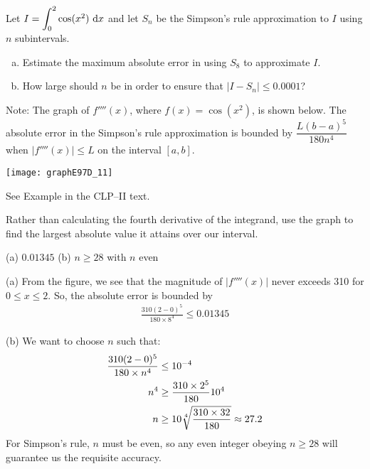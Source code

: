 \begin{question}[1997D]
Let $I={\displaystyle\int_0^2}\cos(x^2)\ \dee{x}$ and
let $S_n$ be the Simpson's rule approximation to $I$ using $n$ subintervals.
\begin{enumerate}[(a)]
\item
Estimate the maximum absolute error in using $S_8$ to approximate $I$.
\item
How large should $n$ be in order to ensure that $|I-S_n|\le 0.0001$?
\end{enumerate}
\noindent  Note: The graph of $f''''(x)$, where $f(x)=\cos(x^2)$,
is shown below. The absolute error in the Simpson's rule approximation
is bounded by $\dfrac{L(b-a)^5}{180n^4}$ when $|f''''(x)|\le L$ on the
interval $[a,b]$.

\begin{center}
       \texttt{[image: graphE97D\_11]}
\end{center}

\end{question}

\begin{hint}
See Example  in the
CLP--II text.

Rather than calculating the fourth derivative of the integrand, use the graph to find the largest absolute value it attains over our interval.
\end{hint}

\begin{answer} (a)
$0.01345$
\qquad (b)
 $n\ge 28$ with $n$ even

\end{answer}

\begin{solution} (a)
From the figure, we see that the magnitude of $|f''''(x)|$
never exceeds 310 for $0\le x\le 2$. So, the absolute error is bounded by
\begin{align*}
\frac{310(2-0)^5}{180\times 8^4}\le 0.01345
\end{align*}

\noindent (b)
We want to choose $n$ such that:
\begin{align*}
\frac{310(2-0)^5}{180\times n^4}&\le 10^{-4}\\
n^4&\ge \frac{310\times 2^5}{180}10^4\\
n&\ge 10\root 4 \of {\frac{310\times 32}{180}}\approx27.2
\end{align*}
For Simpson's rule, $n$ must be even, so any even integer obeying
$n\ge28$ will guarantee us the requisite accuracy.

\end{solution}

